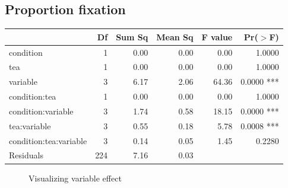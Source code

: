 \documentclass{article}
\begin{document}
\subsection{Proportion fixation}

\begin{table}[H]
\centering
\begin{tabular}{lrrrrr}
  \hline
 & Df & Sum Sq & Mean Sq & F value & Pr($>$F) \\ 
  \hline
condition              & 1 & 0.00 & 0.00 & 0.00 & 1.0000 \\ 
  tea                    & 1 & 0.00 & 0.00 & 0.00 & 1.0000 \\ 
  variable               & 3 & 6.17 & 2.06 & 64.36 & 0.0000 ***\\ 
  condition:tea          & 1 & 0.00 & 0.00 & 0.00 & 1.0000 \\ 
  condition:variable     & 3 & 1.74 & 0.58 & 18.15 & 0.0000 ***\\ 
  tea:variable           & 3 & 0.55 & 0.18 & 5.78 & 0.0008 ***\\ 
  condition:tea:variable & 3 & 0.14 & 0.05 & 1.45 & 0.2280 \\ 
  Residuals              & 224 & 7.16 & 0.03 &  &  \\ 
   \hline
\end{tabular}
\end{table}


\begin{figure}[H]
  \caption{Visualizing variable effect}
  \noindent{}
  \centering
\end{figure}
\end{document}
